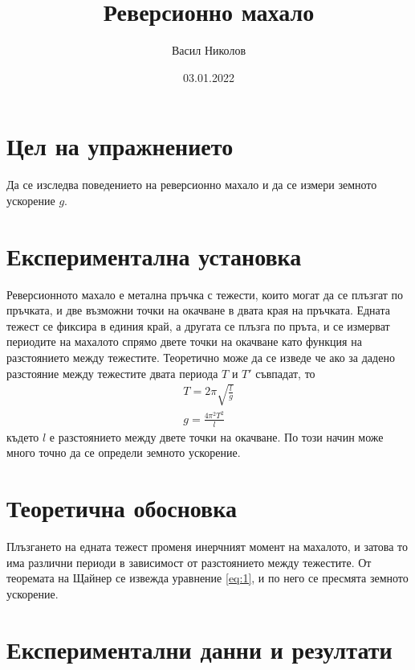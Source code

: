 \documentclass[aps, prb, twocolumn, a4paper, floatfix, reprint]{revtex4-2}
\begin{document}
\title{Реверсионно махало}
\author{Васил Николов}
\noaffiliation
\date{03.01.2022}
\maketitle

\section{Цел на упражнението}
Да се изследва поведението на реверсионно махало и да се измери земното ускорение $g$.

\section{Експериментална установка}
Реверсионното махало е метална пръчка с тежести, които могат да се плъзгат по пръчката, и две възможни точки на окачване в двата края на пръчката. Едната тежест се фиксира в единия край, а другата се плъзга по пръта, и се измерват периодите на махалото спрямо двете точки на окачване като функция на разстоянието между тежестите. Теоретично може да се изведе че ако за дадено разстояние между тежестите двата периода $T$ и $T'$ съвпадат, то
\begin{gather*} \label{eq:1}
    T = 2\pi \sqrt{\frac{l}{g}} \\
    g = \frac{4\pi^2 T^2}{l} \tag{1}
\end{gather*}
където $l$ е разстоянието между двете точки на окачване. По този начин може много точно да се определи земното ускорение.  

\section{Теоретична обосновка}
Плъзгането на едната тежест променя инерчният момент на махалото, и затова то има различни периоди в зависимост от разстоянието между тежестите. От теоремата на Щайнер се извежда уравнение \eqref{eq:1}, и по него се пресмята земното ускорение. 

\section{Експериментални данни и резултати}
\end{document}
